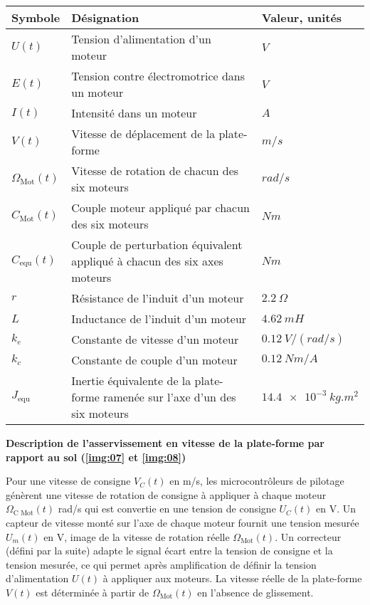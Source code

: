\begin{center}
\begin{tabular}{lll}
\hline
\textbf{Symbole} & \textbf{Désignation} & \textbf{Valeur, unités} \\  \hline\hline
$U(t)$  			& Tension d’alimentation d’un moteur 		& $\si{V}$ \\ \hline
$E(t)$ 			& Tension contre électromotrice dans un moteur 	& $\si{V}$ \\ \hline
$I (t)$			& Intensité dans un moteur 			& $\si{A}$ \\ \hline
$V(t)$ 			& Vitesse de déplacement de la plate-forme 		& $\si{m/s}$\\ \hline
$\Omega_{\text{Mot}}(t)$& Vitesse de rotation de chacun des six moteurs	& $\si{rad/s}$ \\\hline
$C_{\text{Mot}}(t)$ 	& Couple moteur appliqué par chacun des six moteurs & $\si{Nm}$ \\ \hline
$C_{\text{equ}}(t)$ 	& Couple de perturbation équivalent appliqué à chacun des six axes moteurs
& $\si{Nm}$ \\ \hline
$r$ 			& Résistance de l’induit d’un moteur 		& $\SI{2,2}{\Omega}$ \\ \hline 
$L$ 			& Inductance de l’induit d’un moteur 	& $\SI{4,62}{mH}$ \\ \hline
$k_e$ 			& Constante de vitesse d’un moteur 	& $\SI{0,12}{V/(rad/s)}$ \\ \hline
$k_c$ 			& Constante de couple d’un moteur 		& $\SI{0,12}{Nm/A}$ \\ \hline
$J_{\text{equ}}$		& Inertie équivalente de la plate-forme ramenée sur l’axe d’un des six moteurs
& $\SI{14,4e-3}{kg.m^2}$ \\ \hline
\end{tabular}
\end{center}

\textbf{Description de l’asservissement en vitesse de la plate-forme par rapport au sol (\autoref{img:07} et \autoref{img:08})}

Pour une vitesse de consigne $V_C (t)$ en \si{m/s}, les microcontrôleurs de pilotage génèrent une vitesse de rotation de consigne à appliquer à chaque moteur $\Omega_{\text{C Mot}}(t)$ \si{rad/s} qui est convertie en une tension de consigne $U_C (t)$ en \si{V}. Un capteur de vitesse monté sur l’axe de chaque moteur fournit une tension mesurée $U_m (t)$ en \si{V}, image de la vitesse de rotation réelle $\Omega_{\text{Mot}}(t)$. Un correcteur (défini par la suite) adapte le signal écart entre la tension de consigne et la tension mesurée, ce qui permet après amplification de définir la tension d’alimentation $U(t)$ à appliquer aux moteurs. La vitesse réelle de la plate-forme $V (t)$ est déterminée à partir de $\Omega_{\text{Mot}}(t)$ en l’absence de glissement.

